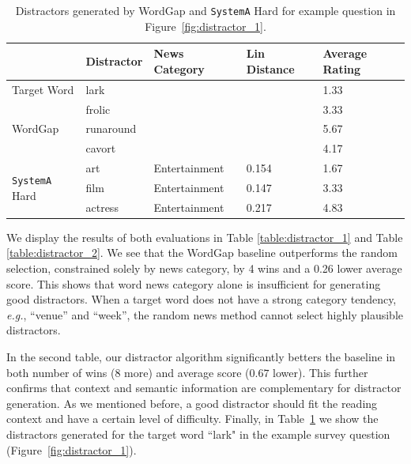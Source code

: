 \begin{table}[ht]
\caption{Distractors generated by WordGap and {\tt SystemA} Hard for example question in Figure~\ref{fig:distractor_1}.} 
\label{table:example_distractors}
\centering
\begin{tabular}{|l|l|l|l|l|}
\hline
                              & {\bf Distractor} & {\bf News Category} & {\bf Lin Distance} & {\bf Average Rating} \\ \hline
Target Word                   & lark       &               &              & 1.33       \\ \hline
\multirow{3}{*}{WordGap}      & frolic     &               &              & 3.33       \\ \cline{2-5} 
                              & runaround  &               &              & 5.67       \\ \cline{2-5} 
                              & cavort     &               &              & 4.17       \\ \hline
\multirow{3}{*}{{\tt SystemA} Hard} & art        & Entertainment & 0.154        & 1.67       \\ \cline{2-5} 
                              & film       & Entertainment & 0.147        & 3.33       \\ \cline{2-5} 
                              & actress    & Entertainment & 0.217        & 4.83       \\ \hline
\end{tabular}
\end{table}

We display the results of both evaluations in Table
\ref{table:distractor_1} and Table \ref{table:distractor_2}.  We see
that the WordGap baseline outperforms the random selection,
constrained solely by news category, by 4 wins and a 0.26 lower
average score.  This shows that word news category alone is
insufficient for generating good distractors.  When a target word does
not have a strong category tendency, {\it e.g.}, ``venue'' and
``week'', the random news method cannot select highly plausible
distractors. 

In the second table, our distractor algorithm significantly betters
the baseline in both number of wins (8 more) and average score ($0.67$
lower).  This further confirms that context and semantic information
are complementary for distractor generation. As we mentioned before, a
good distractor should fit the reading context and have a certain
level of difficulty.
Finally, in Table~\ref{table:example_distractors} we show the distractors generated for the target word “lark" in the example survey question (Figure~\ref{fig:distractor_1}).



